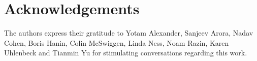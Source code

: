 \section{Acknowledgements}
The authors express their gratitude to Yotam Alexander, Sanjeev Arora, Nadav Cohen, Boris Hanin, Colin McSwiggen, Linda Ness, Noam Razin, Karen Uhlenbeck and Tianmin Yu for stimulating conversations regarding this work. 